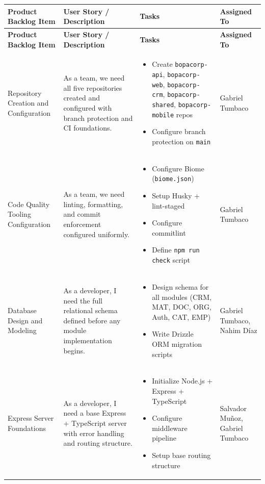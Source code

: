 \documentclass[letterpaper%
, oneside%
, 12pt%
, memoireprojet%
, english%
,creativecommons,hyperref, withAlgo2e %
]{thETS}
\begin{document}
\begingroup
\setlength{\LTleft}{-1.2cm plus -1fill}
\setlength{\LTright}{\LTleft}
\setlength{\LTcapwidth}{\textwidth}
\begin{longtable}{|p{3.0cm}|p{4.6cm}|p{5.6cm}|p{3.0cm}|}
\hline
\textbf{Product Backlog Item} & \textbf{User Story / Description} & \textbf{Tasks} & \textbf{Assigned To} \\ \hline
\endfirsthead
\hline
\textbf{Product Backlog Item} & \textbf{User Story / Description} & \textbf{Tasks} & \textbf{Assigned To} \\ \hline


\endhead
Repository Creation and Configuration & As a team, we need all five repositories created and configured with branch protection and CI foundations. & \begin{itemize}\setlength{\itemsep}{2pt}
    \item Create \texttt{bopacorp-api}, \texttt{bopacorp-web}, \texttt{bopacorp-crm}, \texttt{bopacorp-shared}, \texttt{bopacorp-mobile} repos
    \item Configure branch protection on \texttt{main}
\end{itemize} & Gabriel Tumbaco \\ \hline

Code Quality Tooling Configuration & As a team, we need linting, formatting, and commit enforcement configured uniformly. & \begin{itemize}\setlength{\itemsep}{2pt}
    \item Configure Biome (\texttt{biome.json})
    \item Setup Husky + lint-staged
    \item Configure commitlint
    \item Define \texttt{npm run check} script
\end{itemize} & Gabriel Tumbaco \\ \hline

Database Design and Modeling & As a developer, I need the full relational schema defined before any module implementation begins. & \begin{itemize}\setlength{\itemsep}{2pt}
    \item Design schema for all modules (CRM, MAT, DOC, ORG, Auth, CAT, EMP)
    \item Write Drizzle ORM migration scripts
\end{itemize} & Gabriel Tumbaco, Nahim Díaz \\ \hline

Express Server Foundations & As a developer, I need a base Express + TypeScript server with error handling and routing structure. & \begin{itemize}\setlength{\itemsep}{2pt}
    \item Initialize Node.js + Express + TypeScript
    \item Configure middleware pipeline
    \item Setup base routing structure
\end{itemize} & Salvador Muñoz, Gabriel Tumbaco \\ \hline


\end{longtable}
\end{document}
